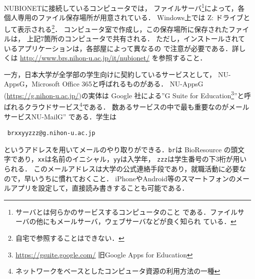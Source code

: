 \documentclass[a4j]{ltjsarticle}
\begin{document}
NUBIONETに接続しているコンピュータでは，
ファイルサーバ\footnote{サーバとは何らかのサービスするコンピュータのこと
である．ファイルサーバの他にもメールサーバ，ウェブサーバなどが良く知られ
ている．}によって，各個人専用のファイル保存場所が用意されている．
Windows上では Z: ドライブとして表示される\footnote{自宅で参照することはできない．}．
コンピュータ室で作成し，この保存場所に保存されたファイルは，
上記7箇所のコンピュータで共有される．
ただし，インストールされているアプリケーションは，各部屋によって異なるの
で注意が必要である．詳しくは
\url{http://www.brs.nihon-u.ac.jp/it/nubionet/}
を参照すること．

一方，日本大学が全学部の学生向けに契約しているサービスとして，
NU-AppsG，Microsoft Office 365と呼ばれるものがある．
NU-AppsG (\url{https://g.nihon-u.ac.jp/})の実体は
Google 社による''G Suite for Education\footnote{\url{https://gsuite.google.com/} 旧Google Apps for Education}''と呼ばれるクラウドサービス\footnote{ネットワークをベースとしたコンピュータ資源の利用方法の一種}である．
数あるサービスの中で最も重要なのがメールサービスNU-MailG''
である．学生は
\begin{lstlisting}
 brxxyyzzz@g.nihon-u.ac.jp 
\end{lstlisting}
というアドレスを用いてメールのやり取りができる．{\tt br}は BioResource
の頭文字であり，{\tt xx}は名前のイニシャル，{\tt yy}は入学年，
{\tt zzz}は学生番号の下3桁が用いられる．
このメールアドレスは大学の公式連絡手段であり，就職活動に必要なので，早いうちに慣れておくこと．
iPhoneやAndroid等のスマートフォンのメールアプリを設定して，直接読み書きすることも可能である．
\end{document}
